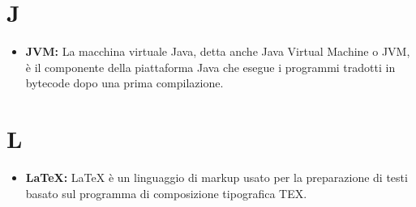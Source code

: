 \documentclass[a4paper]{article}
\begin{document}
	\section{J}	
	\begin{itemize}
		\item \textbf{JVM:} La macchina virtuale Java, detta anche Java Virtual Machine o JVM, è il componente della piattaforma
		 Java che esegue i programmi tradotti in bytecode dopo una prima compilazione.
	\end{itemize}
	
	\section{L}
	\begin{itemize}
		\item \textbf{LaTeX:} LaTeX  è un linguaggio di markup usato per la preparazione di testi basato sul programma di
		 composizione tipografica TEX.
	\end{itemize}
		
\end{document}
